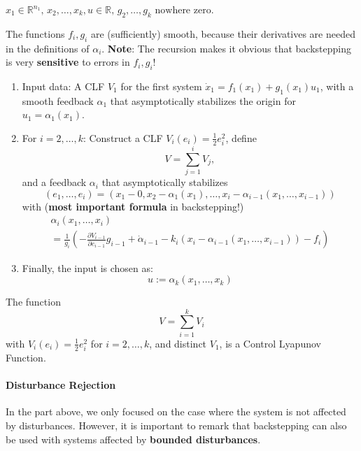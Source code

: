 $x_1 \in \mathbb{R}^{n_1}, \, x_2, \ldots, x_k, u \in \mathbb{R}, \, g_2, \ldots, g_k \text{ nowhere zero}.$

The functions $f_i, g_i$ are (sufficiently) smooth, because their derivatives are needed in the definitions of $\alpha_i$.
\newpar{}
\textbf{Note}: The recursion makes it obvious that backstepping is very \textbf{sensitive} to errors in $f_i, g_i$!

\newpar{}

\begin{enumerate}
    \item Input data: A CLF $V_1$ for the first system $\dot{x}_1 = f_1(x_1) + g_1(x_1)u_1$, with a smooth feedback $\alpha_1$ that asymptotically stabilizes the origin for $u_1 = \alpha_1(x_1)$.
    \item For $i = 2, \ldots, k$:
          Construct a CLF $V_i(e_i) = \frac{1}{2}e_i^2$, define
          \begin{equation*}
              V = \sum_{j=1}^i V_j,
          \end{equation*}
          and a feedback $\alpha_i$ that asymptotically stabilizes
              {\small
                  \begin{equation*}
                      (e_1, \ldots, e_i) = (x_1-0, x_2-\alpha_1(x_1), \ldots, x_i-\alpha_{i-1}(x_1,\ldots,x_{i-1}))
                  \end{equation*}
              }
          with (\textbf{most important formula} in backstepping!)
          {\footnotesize
                  \begin{gather*}
                      \alpha_i(x_1, \ldots, x_i) \\
                      = \frac{1}{g_i}\left( -\frac{\partial V_{i-1}}{\partial e_{i-1}}g_{i-1} + \dot{\alpha}_{i-1} - k_i(x_i - \alpha_{i-1}(x_1, \ldots, x_{i-1})) - f_i \right)
                  \end{gather*}
              }
    \item Finally, the input is chosen as:
          \begin{equation*}
              u := \alpha_k(x_1, \ldots, x_k)
          \end{equation*}
\end{enumerate}
\newpar{}

The function
\begin{equation*}
    V = \sum_{i=1}^k V_i
\end{equation*}
with $V_i(e_i) = \frac{1}{2}e_i^2$ for $i = 2, \ldots, k$, and distinct $V_1$, is a Control Lyapunov Function.

\paragraph{Disturbance Rejection}
In the part above, we only focused on the case where the system is not affected by disturbances. However, it is important to remark that backstepping can also be used with systems affected by \textbf{bounded disturbances}.

